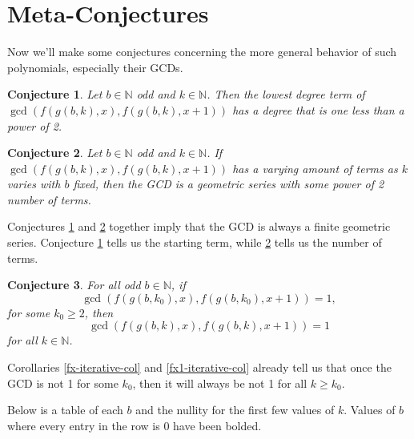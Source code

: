 \documentclass{article}
\newtheorem{conjecture}{Conjecture}
\newcommand{\N}{\mathbb{N}}
\begin{document}
	\newpage
	\section{Meta-Conjectures}
	Now we'll make some conjectures concerning the more general behavior of such polynomials, especially their GCDs.
	\begin{conjecture}\label{gcd-lowest-deg-term-conj}
		Let $b \in \N$ odd and $k \in \N$. 
		Then the lowest degree term of $\gcd\left(f(g(b,k),x),f(g(b,k),x+1)\right)$ has a degree that is one less than a power of 2.
	\end{conjecture}

	\begin{conjecture}\label{gcd-num-terms-conj}
		Let $b \in \N$ odd and $k \in \N$.
		If $\gcd\left(f(g(b,k),x),f(g(b,k),x+1)\right)$ has a varying amount of terms as $k$ varies with $b$ fixed, then the GCD is a geometric series with some power of 2 number of terms.
	\end{conjecture}
	
	Conjectures \ref{gcd-lowest-deg-term-conj} and \ref{gcd-num-terms-conj} together imply that the GCD is always a finite geometric series.
	Conjecture \ref{gcd-lowest-deg-term-conj} tells us the starting term, while \ref{gcd-num-terms-conj} tells us the number of terms.

	\begin{conjecture}
		For all odd $b \in \N$, if
		\begin{equation*}
			\gcd\left(f(g(b,k_0),x), f(g(b,k_0),x+1)\right) = 1,
		\end{equation*}
		for some $k_0 \geq 2$, then
		\begin{equation*}
			\gcd\left(f(g(b,k),x), f(g(b,k),x+1)\right) = 1
		\end{equation*}
		for all $k \in \N$.
	\end{conjecture}

	Corollaries \ref{fx-iterative-col} and \ref{fx1-iterative-col} already tell us that once the GCD is not 1 for some $k_0$, then it will always be not 1 for all $k \geq k_0$.
	
	Below is a table of each $b$ and the nullity for the first few values of $k$.
	Values of $b$ where every entry in the row is 0 have been bolded.
	
\end{document}
